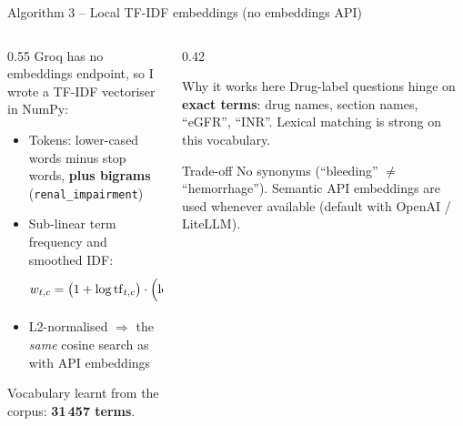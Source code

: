 \documentclass[aspectratio=169,11pt]{beamer}
\begin{document}
\begin{frame}{Algorithm 3 -- Local TF-IDF embeddings (no embeddings API)}
  \begin{columns}[T]
    \begin{column}{0.55\textwidth}
      Groq has no embeddings endpoint, so I wrote a TF-IDF vectoriser in NumPy:
      \begin{itemize}
        \item Tokens: lower-cased words minus stop words, \textbf{plus bigrams} (\texttt{renal\_impairment})
        \item Sub-linear term frequency and smoothed IDF:
        \[
          w_{t,c} = \bigl(1+\log \mathrm{tf}_{t,c}\bigr)\cdot\Bigl(\log\frac{1+N}{1+\mathrm{df}_t}+1\Bigr)
        \]
        \item L2-normalised $\Rightarrow$ the \emph{same} cosine search as with API embeddings
      \end{itemize}
      {\small Vocabulary learnt from the corpus: \textbf{31\,457 terms}.}
    \end{column}
    \begin{column}{0.42\textwidth}
      \begin{block}{Why it works here}
        \small
        Drug-label questions hinge on \textbf{exact terms}: drug names, section names,
        ``eGFR'', ``INR''. Lexical matching is strong on this vocabulary.
      \end{block}
      \vspace{0.3em}
      \begin{block}{Trade-off}
        \small
        No synonyms (``bleeding'' $\neq$ ``hemorrhage''). Semantic API embeddings are used
        whenever available (default with OpenAI / LiteLLM).
      \end{block}
    \end{column}
  \end{columns}
\end{frame}
\end{document}
